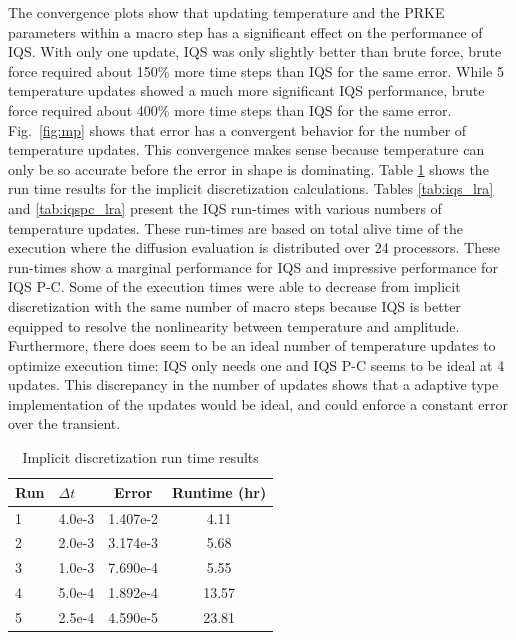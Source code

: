 \documentclass{anstrans}
\newcommand{\fig}[1]{Fig.~\ref{#1}}                      %
\begin{document}
The convergence plots show that updating temperature and the PRKE parameters within a macro step has a significant effect on the performance of IQS.  With only one update, IQS was only slightly better than brute force, brute force required about 150\% more time steps than IQS for the same error.  While 5 temperature updates showed a much more significant IQS performance, brute force required about 400\% more time steps than IQS for the same error.  \fig{fig:mp} shows that error has a convergent behavior for the number of temperature updates.  This convergence makes sense because temperature can only be so accurate before the error in shape is dominating. Table \ref{tab:ndiff_lra} shows the run time results for the implicit discretization calculations.  Tables \ref{tab:iqs_lra} and \ref{tab:iqspc_lra} present the IQS run-times with various numbers of temperature updates.  These run-times are based on total alive time of the execution where the diffusion evaluation is distributed over 24 processors. These run-times show a marginal performance for IQS and impressive performance for IQS P-C.  Some of the execution times were able to decrease from implicit discretization with the same number of macro steps because IQS is better equipped to resolve the nonlinearity between temperature and amplitude. Furthermore, there does seem to be an ideal number of temperature updates to optimize execution time: IQS only needs one and IQS P-C seems to be ideal at 4 updates. This discrepancy in the number of updates shows that a adaptive type implementation of the updates would be ideal, and could enforce a constant error over the transient. \\

\begin{table}[!htbp]
\begin{center}
\begin{tabular}{|l|l|cc|}
\hline
Run  &  $\Delta t$ & Error & Runtime (hr) \\
\hline
1	& 4.0e-3	& 1.407e-2 	& 4.11	\\
2	& 2.0e-3	& 3.174e-3 	& 5.68 	\\
3 	& 1.0e-3 	& 7.690e-4 	& 5.55	\\
4 	& 5.0e-4 	& 1.892e-4 	& 13.57	\\
5 	& 2.5e-4	& 4.590e-5 	& 23.81	\\
\hline
\end{tabular}
\end{center}
\caption{Implicit discretization run time results}
\label{tab:ndiff_lra}
\end{table}
\end{document}
